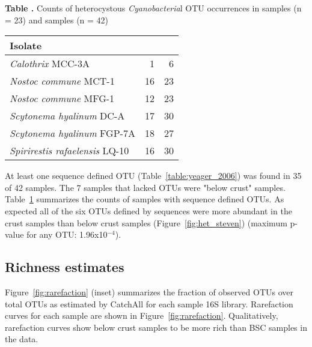 \begin{table}

\textbf{
    \label{table:het_dist}
    Table . }{Counts of heterocystous \textit{Cyanobacteria}l OTU occurrences in \citet{Garcia_Pichel_2013} samples (n = 23) and \citet{Steven_2013} samples (n = 42)}

{\centering
\begin{tabular}{lrr}
  \toprule
 Isolate & \citet{Garcia_Pichel_2013} & \citet{Steven_2013} \\ 
  \midrule
  \textit{Calothrix} MCC-3A &   1 &   6 \\ \midrule
  \textit{Nostoc commune} MCT-1 &  16 &  23 \\ \midrule
  \textit{Nostoc commune} MFG-1 &  12 &  23 \\ \midrule
  \textit{Scytonema hyalinum} DC-A &  17 &  30 \\ \midrule
  \textit{Scytonema hyalinum} FGP-7A &  18 &  27 \\ \midrule
  \textit{Spirirestis rafaelensis} LQ-10 &  16 &  30 \\
   \bottomrule
\end{tabular}}{}
\end{table}

At least one \citet{Yeager} sequence defined OTU
(Table~\ref{table:yeager_2006}) was found in 35 of 42 \citet{Steven_2013}
samples. The 7 samples that lacked \citet{Yeager} OTUs were "below crust"
samples.  Table~\ref{table:het_dist} summarizes the counts of
\citet{Steven_2013} samples with \citet{Yeager} sequence defined OTUs. As
expected all of the six OTUs defined by \citet{Yeager} sequences were more
abundant in the crust samples than below crust samples
(Figure~\ref{fig:het_steven}) (maximum p-value for any OTU: 1.96x10$^{-4}$).

\subsection{Richness estimates}
Figure~\ref{fig:rarefaction} (inset) summarizes the fraction of observed OTUs
over total OTUs as estimated by CatchAll for each sample 16S library.
Rarefaction curves for each sample are shown in Figure~\ref{fig:rarefaction}.
Qualitatively, rarefaction curves show below crust samples to be more rich than
BSC samples in the \citet{Steven_2013} data.
